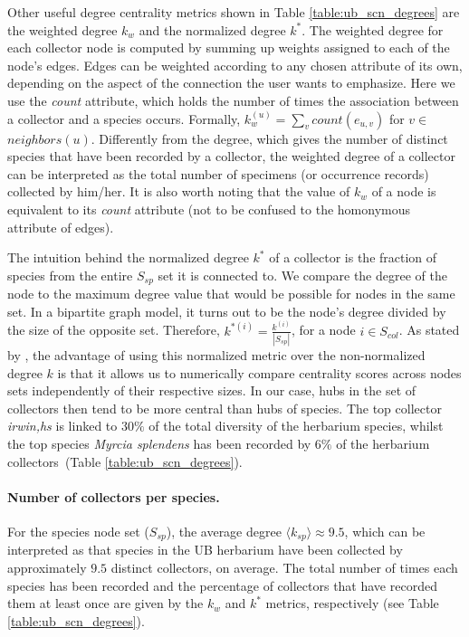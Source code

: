 Other useful degree centrality metrics shown in Table \ref{table:ub_scn_degrees} are the weighted degree $k_w$ and the normalized degree $k^*$. The weighted degree for each collector node is computed by summing up weights assigned to each of the node's edges. Edges can be weighted according to any chosen attribute of its own, depending on the aspect of the connection the user wants to emphasize. Here we use the \textit{count} attribute, which holds the number of times the association between a collector and a species occurs. Formally, $k_w^{(u)} = \sum_{v} count(e_{u,v})$ for $v \in$ $neighbors(u)$. Differently from the degree, which gives the number of distinct species that have been recorded by a collector, the weighted degree of a collector can be interpreted as the total number of specimens (or occurrence records) collected by him/her. It is also worth noting that the value of $k_w$ of a node is equivalent to its \textit{count} attribute (not to be confused to the homonymous attribute of edges).

The intuition behind the normalized degree $k^*$ of a collector is the fraction of species from the entire $S_{sp}$ set it is connected to. We compare the degree of the node to the maximum degree value that would be possible for nodes in the same set. In a bipartite graph model, it turns out to be the node's degree divided by the size of the opposite set. Therefore, $k^{*(i)} = \frac{k^{(i)}}{|S_{sp}|}$, for a node $i \in S_{col}$. 
As stated by , the advantage of using this normalized metric over the non-normalized degree $k$ is that it allows us to numerically compare centrality scores across nodes sets independently of their respective sizes. 
In our case, hubs in the set of collectors then tend to be more central than hubs of species. The top collector \textit{irwin,hs} is linked to $30\%$ of the total diversity of the herbarium species, whilst the top species \textit{Myrcia splendens} has been recorded by $6\%$ of the herbarium collectors~(Table \ref{table:ub_scn_degrees}). 

\paragraph{Number of collectors per species.}
For the species node set ($S_{sp}$), the average degree $\langle k_{sp}\rangle \approx 9.5$, which can be interpreted as that species in the UB herbarium have been collected by approximately $9.5$ distinct collectors, on average. 
The total number of times each species has been recorded and the percentage of collectors that have recorded them at least once are given by the $k_w$ and $k^*$ metrics, respectively (see Table \ref{table:ub_scn_degrees}).

